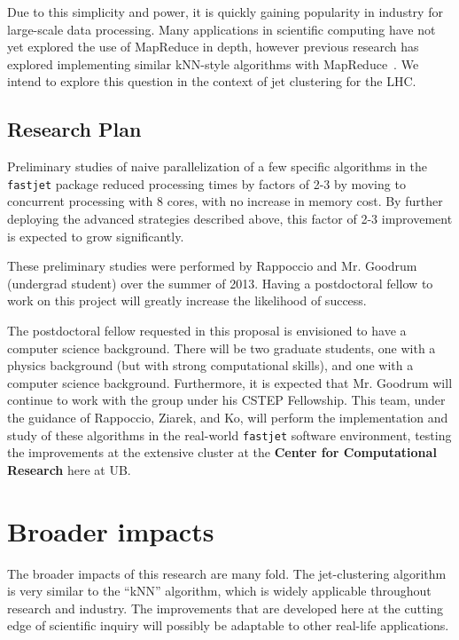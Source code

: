 \documentclass[times,11pt]{article}
\begin{document}
Due to this simplicity and power, it is quickly gaining popularity in industry
for large-scale data processing. Many applications in scientific computing have not
yet explored the use of MapReduce in depth, however
previous research has explored implementing similar kNN-style
algorithms with
MapReduce~\cite{knn-mapreduce-0, knn-mapreduce-1}. We intend to explore this
question in the context of jet clustering for the LHC.



\subsection{Research Plan}

Preliminary studies of naive parallelization of a few specific
algorithms in the {\tt fastjet} package reduced processing times by
factors of 2-3 by moving to concurrent processing with 8 cores, with
no increase in memory cost. By further deploying the advanced
strategies described above, this factor of 2-3 improvement is expected
to grow significantly. 

These preliminary studies were performed by Rappoccio and Mr.
Goodrum (undergrad student) over the summer of 2013. Having a
postdoctoral fellow to work on this project will greatly increase the
likelihood of success. 

The postdoctoral fellow requested in this proposal is envisioned to
have a computer science background. There will be two graduate
students, one with a physics background (but with strong computational
skills), and one with a computer science background. Furthermore, it
is expected that Mr. Goodrum will continue to work with the group
under his CSTEP Fellowship. This team, under
the guidance of Rappoccio, Ziarek, and Ko, will perform the
implementation and study of these algorithms in the real-world 
{\tt fastjet} software environment, testing the improvements at the
extensive cluster at the {\bf Center for Computational Research} here
at UB. 





\section{Broader impacts}

The broader impacts of this research are many fold. The jet-clustering
algorithm is very similar to the ``kNN'' algorithm, which is widely
applicable throughout research and industry. The improvements that are
developed here at the cutting edge of scientific inquiry will possibly be
adaptable to other real-life applications. 
\end{document}
